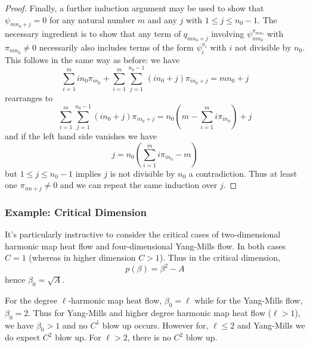 \documentclass{amsart}
\begin{document}
\begin{proof}
Finally, a further induction argument may be used to show that \(\psi_{m n_0 +j} = 0\) for any natural number \(m\) and any \(j\) with \(1 \leq j \leq n_0 - 1\). The necessary ingredient is to show that any term of \(q_{m n_0 + j}\) involving \(\psi_{m n_0}^{\pi_{m n_0}}\) with \(\pi_{m n_0} \ne 0\) necessarily also includes terms of the form \(\psi_i^{\pi_i}\) with \(i\) not divisible by \(n_0\). This follows in the same way as before: we have
\[
\sum_{i=1}^m i n_0 \pi_{i n_0} + \sum_{i=1}^m \sum_{j=1}^{n_0 -1} (i n_0 + j) \pi_{i n_0 + j} = m n_0 + j
\]
rearranges to
\[
\sum_{i=1}^m \sum_{j=1}^{n_0 -1} (i n_0 + j) \pi_{i n_0 + j} = n_0\left(m - \sum_{i=1}^m i \pi_{i n_0}\right) + j
\]
and if the left hand side vanishes we have
\[
j = n_0\left(\sum_{i=1}^m i \pi_{i n_0} - m\right)
\]
but \(1 \leq j \leq n_0 - 1\) implies \(j\) is not divisible by \(n_0\) a contradiction. Thus at least one \(\pi_{im + j} \ne 0\) and we can repeat the same induction over \(j\).
\end{proof}

\subsubsection*{Example: Critical Dimension}

It's particularly instructive to consider the critical cases of two-dimensional harmonic map heat flow and four-dimensional Yang-Mills flow. In both cases \(C = 1\) (whereas in higher dimension \(C > 1\)). Thus in the critical dimension,
\[
p(\beta) = \beta^2 - A
\]
hence \(\beta_0 = \sqrt{A}\).

For the degree \(\ell\)-harmonic map heat flow, \(\beta_0 = \ell\) while for the Yang-Mills flow, \(\beta_0 = 2\). Thus for Yang-Mills and higher degree harmonic map heat flow (\(\ell > 1\)), we have \(\beta_0 > 1\) and no \(C^1\) blow up occurs. However for, \(\ell \leq 2\) and Yang-Mills we do expect \(C^2\) blow up. For \(\ell > 2\), there is no \(C^2\) blow up.
\end{document}
